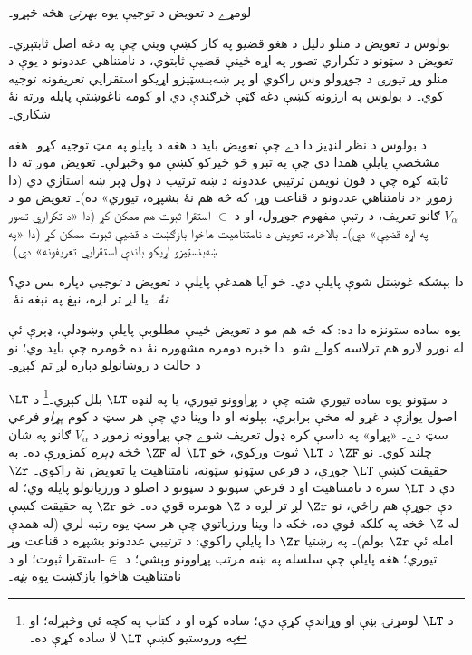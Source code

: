 \documentclass[../../../include/open-logic-section]{subfiles}
\begin{document}

لومړے د تعويض د توجيې يوه \emph{بهرنۍ} هڅه څېړو۔
\begin{explain}
  بولوس د تعويض د منلو دليل د هغو قضيو په کار کښې ويني چې په
  دغه اصل ثابتېږي۔ تعويض د سټونو د تکراري تصور په اړه ځينې
  قضيې ثابتوي، د نامتناهي عددونو د يوې د منلو وړ تيورۍ د جوړولو
  وس راکوي او پر ښه‌بنسټيزو اړيکو استقرايي تعريفونه توجيه کوي۔
  د بولوس په ارزونه کښې دغه ګټې څرګندې دي او کومه ناغوښتې
  پايله ورته نۀ ښکاري۔ \citep[229]{Boolos1971}
\end{explain}
د بولوس د نظر لنډيز دا دے چې تعويض بايد د هغه د پايلو په مټ توجيه
کړو۔ هغه مشخصې پايلې همدا دي چې په تېرو څو څپرکو کښې مو وڅېړلې۔
تعويض موږ ته دا ثابته کړه چې د فون نويمن ترتيبي عددونه د ښه ترتيب د
ډول ډېر ښه استازي دي (دا زموږ «د نامتناهي عددونو د قناعت وړ، که څه
هم نۀ بشپړه، تيوري» ده)۔ تعويض مو د $V_\alpha$ ګانو تعريف، د رتبې
مفهوم جوړول، او د $\in$-استقرا ثبوت هم ممکن کړ (دا «د تکراري تصور په
اړه قضيې» دي)۔ بالاخره، تعويض د نامتناهيت هاخوا بازګښت د قضیې ثبوت
ممکن کړ (دا «په ښه‌بنسټيزو اړيکو باندې استقرايي تعريفونه» دي)۔

دا بېشکه غوښتل شوې پايلې دي۔ خو آيا همدغې پايلې د تعويض د
\emph{توجيې} دپاره بس دي؟ \emph{نۀ}۔ يا لږ تر لږه، نېغ په نېغه نۀ۔

يوه ساده ستونزه دا ده: که څه هم مو د تعويض ځينې مطلوبې پايلې
وښودلې، ډېرې ئې له نورو لارو هم ترلاسه کولے شو۔ دا خبره دومره مشهوره
نۀ ده څومره چې بايد وي؛ نو د حالت د روښانولو دپاره لږ تم کېږو۔

د سټونو يوه ساده تيوري شته چې د پړاوونو تيوري، يا په لنډه $\LT$
بلل کېږي۔\footnote{د $\LT$ لومړنۍ بڼې \citet{Montague1965} او
\citet{Scott1974} وړاندې کړې دي؛ \citet{Potter2004} ساده کړه او
د کتاب په کچه ئې وڅېړله؛ او \citet{ButtonLT1} په وروستيو کښې $\LT$
لا ساده کړې ده۔} د $\LT$ اصول يوازې د غړو له مخې برابري، بېلونه او دا
وينا دي چې هر سټ د کوم \emph{پړاو} فرعي سټ دے۔ «پړاو» په داسې کره ډول
تعريف شوے چې پړاوونه زموږ د $V_\alpha$ ګانو په شان چلند کوي۔ نو $\ZF$
د $\LT$ ثبوت ورکوي، خو $\LT$ له $\ZF$ څخه \emph{ډېره} کمزورې ده۔
په حقيقت کښې $\LT$ جوړې، د فرعي سټونو سټونه، نامتناهيت يا تعويض نۀ
راکوي۔ $\Zr$ دې د $\LT$ سره د نامتناهيت او د فرعي سټونو د سټونو د
اصلو د ورزياتولو پايله وي؛ له دې جوړې هم راځي، نو $\Zr$ لږ تر لږه د
$\Z$ هومره قوي ده۔ خو $\Zr$ په حقيقت کښې له $\Z$ څخه په کلکه قوي
ده، ځکه دا وينا ورزياتوي چې هر سټ يوه رتبه لري (له همدې امله ئې
$\Zr$ بولم)۔ په رښتيا $\Zr$ دا پايلې راکوي: د ترتيبي عددونو بشپړه د
قناعت وړ تيوري؛ هغه پايلې چې سلسله په ښه مرتب پړاوونو وېشي؛ د
$\in$-استقرا ثبوت؛ او د نامتناهيت هاخوا بازګښت يوه \emph{بڼه}۔
\end{document}

